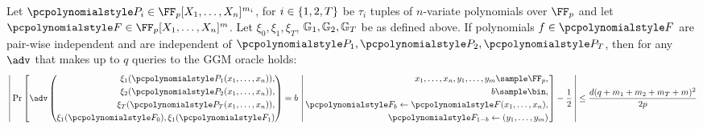 \documentclass[runningheads,11pt]{llncs}
\theoremstyle{definition} \newtheorem{definition}[theorem]{Definition}
\begin{document}
\begin{theorem}
  \label{thm:uber_assumption}
  Let $\p{P}_i \in \FF_p[X_1, \ldots, X_n]^{m_i}$, for
  $i \in \{1, 2, T\}$ be $\tau_i$ tuples of $n$-variate polynomials over
  $\FF_p$ and let $\p{F} \in \FF_p[X_1, \ldots, X_n]^m$. Let
  $\xi_0, \xi_1, \xi_T$, $\mathbb{G}_1, \mathbb{G}_2, \mathbb{G}_T$ be as defined above. If
  polynomials $f \in \p{F}$ are pair-wise independent and are independent of
  $\p{P}_1, \p{P}_2, \p{P}_T$, then for any $\adv$ that makes up to $q$ queries to the
  GGM oracle holds:
  \[
    \left|\,
    \Pr\left[
    \adv\left(
      \begin{aligned}
        \xi_1(\p{P}_1(x_1, \ldots, x_n)), \\
        \xi_2(\p{P}_2(x_1, \ldots, x_n)), \\
        \xi_T(\p{P}_T(x_1, \ldots, x_n)), \\
        \xi_{1}(\p{F}_0), \xi_{1}(\p{F}_1)
      \end{aligned}
    \right) = b
    \, \left|\,
      \begin{aligned}
        x_1, \ldots, x_n, y_1, \ldots, y_m \sample \FF_p,\\
        b \sample \bin, \\
        \p{F}_b \gets \p{F}(x_1, \ldots, x_n),\\
        \p{F}_{1 - b} \gets (y_1, \ldots, y_m)
      \end{aligned}
    \right.  \right] - \frac{1}{2} \, \right| \leq \frac{d(q + m_1 + m_2 + m_T +
  m)^2 }{2p}
  \]
\end{theorem}
\end{document}
